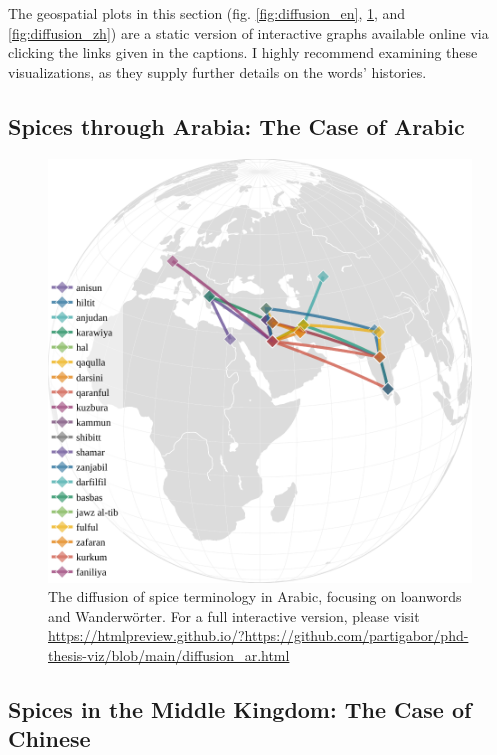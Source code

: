 \begin{note}
    The geospatial plots in this section (fig. \ref{fig:diffusion_en}, \ref{fig:diffusion_ar}, and \ref{fig:diffusion_zh}) are a static version of interactive graphs available online via clicking the links given in the captions. I highly recommend examining these visualizations, as they supply further details on the words' histories.
\end{note}

\subsection{Spices through Arabia: The Case of Arabic}



\begin{figure}[ht!]
    \includegraphics[width=\linewidth]{imgs/plots/diffusion_ar.pdf}
    \caption{The diffusion of spice terminology in Arabic, focusing on loanwords and Wanderwörter. For a full interactive version, please visit \url{https://htmlpreview.github.io/?https://github.com/partigabor/phd-thesis-viz/blob/main/diffusion_ar.html}}
    \label{fig:diffusion_ar}
\end{figure}


\subsection{Spices in the Middle Kingdom: The Case of Chinese }

